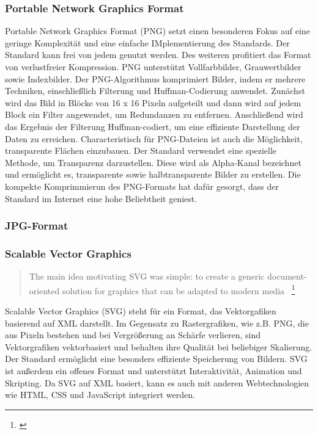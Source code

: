 \subsubsection{Portable Network Graphics Format}
Portable Network Graphics Format (PNG) setzt einen besonderen Fokus auf eine geringe Komplexität und eine einfache IMplementierung des Standards.
Der Standard kann frei von jedem genutzt werden.
Des weiteren profitiert das Format von verlustfreier Kompression. 
PNG unterstützt Vollfarbbilder, Grauwertbilder sowie Indexbilder. 
Der PNG-Algorithmus komprimiert Bilder, indem er mehrere Techniken, einschließlich Filterung und Huffman-Codierung anwendet. Zunächst wird das Bild in Blöcke von 16 x 16 Pixeln aufgeteilt und dann wird auf jedem Block ein Filter angewendet, um Redundanzen zu entfernen. Anschließend wird das Ergebnis der Filterung Huffman-codiert, um eine effiziente Darstellung der Daten zu erreichen.
Characteristisch für PNG-Dateien ist auch die Möglichkeit, transparente Flächen einzubauen.
Der Standard verwendet eine spezielle Methode, um Transparenz darzustellen.
Diese wird als Alpha-Kanal bezeichnet und ermöglicht es, transparente sowie halbtransparente Bilder zu erstellen.
Die kompekte Komprimmierun des PNG-Formats hat dafür gesorgt, dass der Standard im Internet eine hohe Beliebtheit geniest. 

\subsubsection{JPG-Format}


\subsubsection{Scalable Vector Graphics}
\begin{quote}
    The main idea motivating SVG was simple: to create a generic document-oriented solution  for graphics that can be adapted to modern media
    \grqq{}~\footnote{\cite{book:729077}}
\end{quote}

Scalable Vector Graphics (SVG) steht für ein Format, das Vektorgafiken basierend auf XML darstellt.
Im Gegensatz zu Rastergrafiken, wie z.B. PNG, die aus Pixeln bestehen und bei Vergrößerung an Schärfe verlieren, sind Vektorgrafiken vektorbasiert und behalten ihre Qualität bei beliebiger Skalierung.
Der Standard ermöglicht eine besonders effiziente Speicherung von Bildern.
SVG ist außerdem ein offenes Format und unterstützt Interaktivität, Animation und Skripting.
Da SVG auf XML basiert, kann es auch mit anderen Webtechnologien wie HTML, CSS und JavaScript integriert werden.

